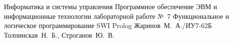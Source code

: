 \documentclass[a4paper,oneside,14pt]{extarticle}
\begin{document}
\makereporttitle
{Информатика и системы управления} %
{Программное обеспечение ЭВМ и информационные технологии} %
{лабораторной работе №~7} %
{Функциональное и логическое программирование} %
{SWI Prolog} %
{} %
{Жаринов~М.~А./ИУ7-62Б} %
{Толпинская~Н.~Б., Строганов~Ю.~В.} %

\setcounter{page}{2}

\renewcommand{\contentsname}{СОДЕРЖАНИЕ}
\tableofcontents

% 
% 



% 
\end{document}

